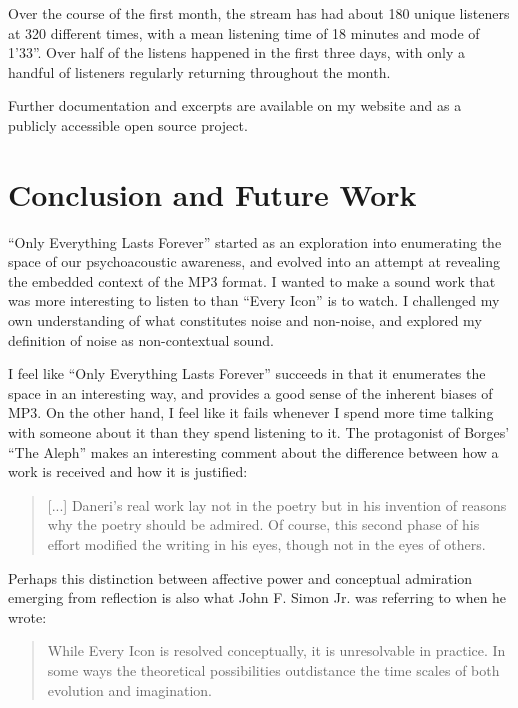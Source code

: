 \documentclass{thesis}
\begin{document}
Over the course of the first month, the stream has had about 180 unique listeners at 320 different times, with a mean listening time of 18 minutes and mode of 1'33''. Over half of the listens happened in the first three days, with only a handful of listeners regularly returning throughout the month.

Further documentation and excerpts are available on my website\cite{kyle_mcdonald_only_2010} and as a publicly accessible open source project\cite{kyle_mcdonald_oelf_2010}.

\chapter{Conclusion and Future Work}

``Only Everything Lasts Forever'' started as an exploration into enumerating the space of our psychoacoustic awareness, and evolved into an attempt at revealing the embedded context of the MP3 format. I wanted to make a sound work that was more interesting to listen to than ``Every Icon'' is to watch. I challenged my own understanding of what constitutes noise and non-noise, and explored my definition of noise as non-contextual sound.

I feel like ``Only Everything Lasts Forever'' succeeds in that it enumerates the space in an interesting way, and provides a good sense of the inherent biases of MP3. On the other hand, I feel like it fails whenever I spend more time talking with someone about it than they spend listening to it. The protagonist of Borges' ``The Aleph'' makes an interesting comment about the difference between how a work is received and how it is justified:
	
	\begin{quote}
	[...] Daneri's real work lay not in the poetry but in his invention of reasons why the poetry should be admired. Of course, this second phase of his effort modified the writing in his eyes, though not in the eyes of others.
	\end{quote}
	
Perhaps this distinction between affective power and conceptual admiration emerging from reflection is also what John F. Simon Jr. was referring to when he wrote:
	
	\begin{quote}
	While Every Icon is resolved conceptually, it is unresolvable in practice. In some ways the theoretical possibilities outdistance the time scales of both evolution and imagination.\cite{john_f._simon_jr._given:32_1997}
	\end{quote}
\end{document}
